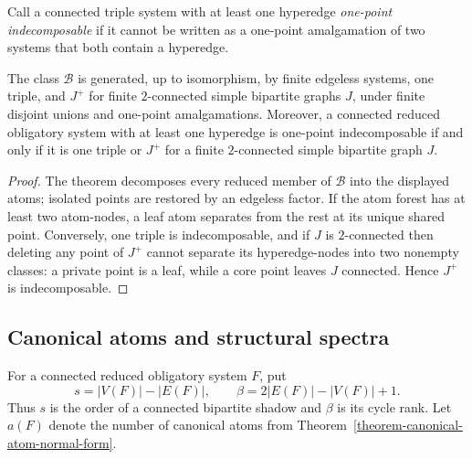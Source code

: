 Call a connected triple system with at least one hyperedge \emph{one-point
indecomposable} if it cannot be written as a one-point amalgamation of two
systems that both contain a hyperedge.

\begin{corollary}
\label{corollary-minimal-generators-indecomposables}
The class $\mathcal B$ is generated, up to isomorphism, by finite edgeless
systems, one triple, and $J^+$ for finite $2$-connected simple bipartite graphs $J$,
under finite disjoint unions and one-point amalgamations.  Moreover, a
connected reduced obligatory system with at least one hyperedge is
one-point indecomposable if and only if it is one triple or $J^+$ for a finite
$2$-connected simple bipartite graph $J$.
\end{corollary}
\begin{proof}
The theorem decomposes every reduced member of $\mathcal B$ into the displayed
atoms; isolated points are restored by an edgeless factor.  If the atom forest
has at least two atom-nodes, a leaf atom separates from the rest at its unique
shared point.  Conversely, one triple is indecomposable, and if $J$ is
$2$-connected then deleting any point of $J^+$ cannot separate its
hyperedge-nodes into two nonempty classes: a private point is a leaf, while a
core point leaves $J$ connected.  Hence $J^+$ is indecomposable.
\end{proof}
\subsection{Canonical atoms and structural spectra}
\label{canonical-atoms-and-structural-spectra}

For a connected reduced obligatory system $F$, put
\[
s=|V(F)|-|E(F)|,
\qquad
\beta=2|E(F)|-|V(F)|+1.
\]
Thus $s$ is the order of a connected bipartite shadow and $\beta$ is its
cycle rank.  Let $a(F)$ denote the number of canonical atoms from
Theorem~\ref{theorem-canonical-atom-normal-form}.

